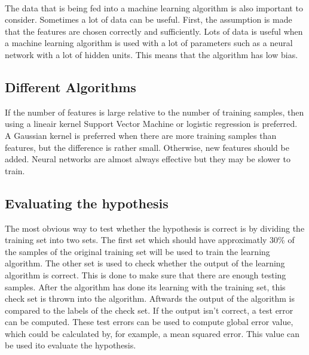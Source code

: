 \\
\noindent The data that is being fed into a machine learning algorithm is also important to consider. Sometimes a lot of data can be useful. First, the assumption is made that the features are chosen correctly and sufficiently. Lots of data is useful when a machine learning algorithm is used with a lot of parameters such as a neural network with a lot of hidden units. This means that the algorithm has low bias. 

\subsection{Different Algorithms}
If the number of features is large relative to the number of training samples, then using a lineair kernel Support Vector Machine or logistic regression is preferred. A Gaussian kernel is preferred when there are more training samples than features, but the difference is rather small. Otherwise, new features should be added. Neural networks are almost always effective but they may be slower to train.

\subsection{Evaluating the hypothesis}
\label{evaluationHypothesis}
The most obvious way to test whether the hypothesis is correct is by dividing the training set into two sets. The first set which should have approximatly 30\% of the samples of the original training set will be used to train the learning algorithm. The other set is used to check whether the output of the learning algorithm is correct. This is done to make sure that there are enough testing samples. After the algorithm has done its learning with the training set, this check set is thrown into the algorithm. Aftwards the output of the algorithm is compared to the labels of the check set. If the output isn't correct, a test error can be computed. These test errors can be used to compute global error value, which could be calculated by, for example, a mean squared error. This value can be used ito evaluate the hypothesis. \cite{evalml}

